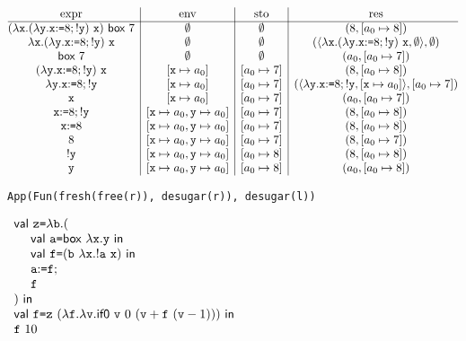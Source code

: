 $
\begin{array}{@{}c|c|c|c@{}}
  \text{expr} & \text{env} & \text{sto} & \text{res} \\\hline
  \eapp{(\efun{\cx}{\eapp{(\efun{\cy}{\eseq{\eset{\cx}{8}}{\ederef{\cy}}})}{\cx}})}{\eref{7}}
  & \emptyset & \emptyset & (8,[a_0\mapsto8]) \\
  \efun{\cx}{\eapp{(\efun{\cy}{\eseq{\eset{\cx}{8}}{\ederef{\cy}}})}{\cx}}
  & \emptyset & \emptyset &
  (\clov{\cx}{\eapp{(\efun{\cy}{\eseq{\eset{\cx}{8}}{\ederef{\cy}}})}{\cx}}{\emptyset},\emptyset) \\
  \eref{7} & \emptyset & \emptyset & (a_0,[a_0\mapsto7]) \\
  \eapp{(\efun{\cy}{\eseq{\eset{\cx}{8}}{\ederef{\cy}}})}{\cx} &
  [\cx\mapsto a_0] & [a_0\mapsto7] & (8,[a_0\mapsto8]) \\
  \efun{\cy}{\eseq{\eset{\cx}{8}}{\ederef{\cy}}} &
  [\cx\mapsto a_0] & [a_0\mapsto7] &
  (\clov{\cy}{\eseq{\eset{\cx}{8}}{\ederef{\cy}}}{[\cx\mapsto a_0]},[a_0\mapsto7]) \\
  \cx & [\cx\mapsto a_0] & [a_0\mapsto7] & (a_0,[a_0\mapsto7]) \\
  \eseq{\eset{\cx}{8}}{\ederef{\cy}} & [\cx\mapsto a_0,\cy\mapsto a_0]
  & [a_0\mapsto7] & (8,[a_0\mapsto8]) \\
  \eset{\cx}{8} & [\cx\mapsto a_0,\cy\mapsto a_0] & [a_0\mapsto7]
  & (8,[a_0\mapsto8]) \\
  8 & [\cx\mapsto a_0,\cy\mapsto a_0] & [a_0\mapsto7] & (8,[a_0\mapsto7]) \\
  \ederef{\cy} & [\cx\mapsto a_0,\cy\mapsto a_0] & [a_0\mapsto8]
  & (8,[a_0\mapsto8]) \\
  \cy & [\cx\mapsto a_0,\cy\mapsto a_0] & [a_0\mapsto8] & (a_0,[a_0\mapsto8]) \\
\end{array}
$
\\

\textbf{}
\vspace{-1em}
\begin{verbatim}
App(Fun(fresh(free(r)), desugar(r)), desugar(l))
\end{verbatim}

\textbf{}

$\begin{array}{l}
  \ebind{\cz}{\efun{\cb}{(\\
  \ \ \ \ \ebind{\ca}{\eref{\efun{\cx}{\cy}}}{\\
  \ \ \ \ \ebind{\cf}{(\eapp{\cb}{\efun{\cx}{\eapp{\ederef{\ca}}{\cx}}})}{\\
  \ \ \ \ \eseq{\eset{\ca}{\cf}}{\\
  \ \ \ \ \cf\\
  }}})}}{\\
  \ebind{\cf}{\eapp{\cz}{(\efun{\cf}{\efun{\cv}{\sumbodyfv}})}}{\\
  \eapp{\cf}{10}}}
\end{array}$
\\

